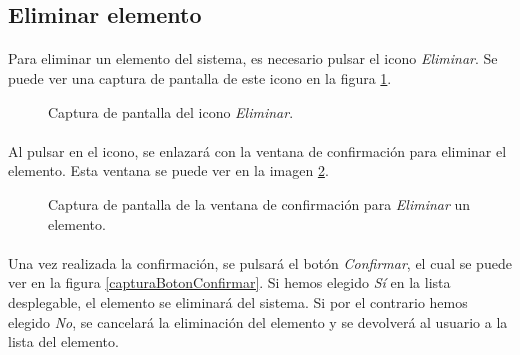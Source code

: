 \subsection{Eliminar elemento}

  \paragraph{}Para eliminar un elemento del sistema,  es necesario pulsar el
  icono \textit{Eliminar}. Se puede ver una captura de pantalla de este
  icono en la figura \ref{capturaDelElemento}.

  \begin{figure}[!ht]
    \begin{center}
      \caption{Captura de pantalla del icono \textit{Eliminar}.}
      \label{capturaDelElemento}
    \end{center}
  \end{figure}

  \paragraph{}Al pulsar en el icono, se enlazará con la ventana de confirmación
  para eliminar el elemento. Esta ventana se puede ver en la imagen
  \ref{capturaConfirmacion}.

  \begin{figure}[!ht]
    \begin{center}
      \caption{Captura de pantalla de la ventana de confirmación para \textit{Eliminar} un elemento.}
      \label{capturaConfirmacion}
    \end{center}
  \end{figure}

  \paragraph{}Una vez realizada la confirmación, se pulsará el botón
  \textit{Confirmar}, el cual se puede ver en la figura
  \ref{capturaBotonConfirmar}. Si hemos elegido \textit{Sí} en la lista
  desplegable, el elemento se eliminará del sistema. Si por el contrario hemos
  elegido \textit{No}, se cancelará la eliminación del elemento y se devolverá
  al usuario a la lista del elemento.

